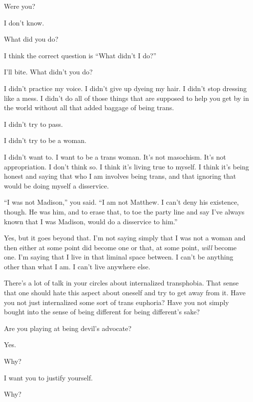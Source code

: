 \begin{paracol}{2}
\begin{leftcolumn}
\begin{ally}
Were you?
\end{ally}
I don't know.
\newpage

\begin{ally}
What did you do?
\end{ally}
I think the correct question is ``What didn't I do?''

\begin{ally}
I'll bite. What didn't you do?
\end{ally}
I didn't practice my voice. I didn't give up dyeing my hair. I didn't stop dressing like a mess. I didn't do all of those things that are supposed to help you get by in the world without all that added baggage of being trans.

I didn't try to pass.

I didn't try to be a woman.

I didn't want to. I want to be a trans woman. It's not masochism. It's not appropriation. I don't think so. I think it's living true to myself. I think it's being honest and saying that who I am involves being trans, and that ignoring that would be doing myself a disservice.

\begin{ally}
``I was not Madison,'' you said. ``I am not Matthew. I can't deny his existence, though. He was him, and to erase that, to toe the party line and say I've always known that I was Madison, would do a disservice to him.''
\end{ally}
Yes, but it goes beyond that. I'm not saying simply that I was not a woman and then either at some point did become one or that, at some point, \emph{will} become one. I'm saying that I live in that liminal space between. I can't be anything other than what I am. I can't live anywhere else.

\begin{ally}
There's a lot of talk in your circles about internalized transphobia. That sense that one should hate this aspect about oneself and try to get away from it. Have you not just internalized some sort of trans euphoria? Have you not simply bought into the sense of being different for being different's sake?
\end{ally}
Are you playing at being devil's advocate?

\begin{ally}
Yes.
\end{ally}
Why?

\begin{ally}
I want you to justify yourself.
\end{ally}
Why?


\end{leftcolumn}
\end{paracol}
